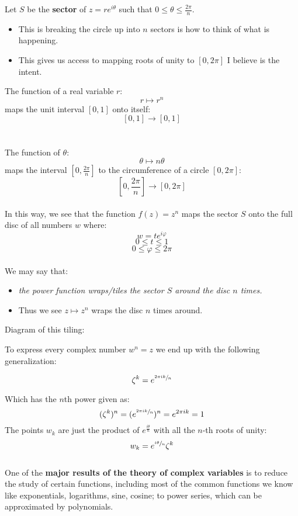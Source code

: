 Let $S$ be the \textbf{sector} of $z = re^{i\theta}$ such that $0 \leq \theta \leq \frac{2\pi}{n}.$ 
\begin{itemize}
	\item This is breaking the circle up into $n$ sectors is how to think of what is happening. 
	\item This gives us access to mapping roots of unity to $[0, 2\pi]$ I believe is the intent.
\end{itemize}

The function of a real variable $r$:
\[r \mapsto r^n \]
maps the unit interval $[0, 1]$ onto itself:
\[[0, 1] \to [0, 1] \]
\\
\\
The function of $\theta$:
\[\theta \mapsto n\theta \]
maps the interval $[0, \frac{2\pi}{n}]$ to the circumference of a circle $[0, 2\pi]$:
\[ [0, \frac{2\pi}{n}] \to [0, 2\pi] \]
\\
In this way, we see that the function $f(z) = z^n$ maps the sector $S$ onto the full disc of all numbers $w$ where:
\[w = te^{i\varphi} \]
\[0 \leq t \leq 1\]
\[0 \leq \varphi \leq 2\pi \]
\\
We may say that:
\begin{itemize}
	\item \textit{the power function wraps/tiles the sector $S$ around the disc $n$ times.}
	\item Thus we see $z \mapsto z^n$ wraps the disc $n$ times around.
\end{itemize}

Diagram of this tiling: \\

To express every complex number $w^n = z$ we end up with the following generalization:
\begin{defn}
	\[\zeta^k = e^{\sfrac{2\pi ik}{n}}\]
\end{defn}
Which has the $n$th power given as:
\[ (\zeta^k)^n = ( e^{\sfrac{2\pi ik}{n}} )^n = e^{2\pi ik} = 1 \]
The points $w_k$ are just the product of $e^{\frac{i\theta}{n}}$ with all the $n$-th roots of unity:
\[w_k = e^{\sfrac{i\theta}{n}}\zeta^k\]
\\
One of the \textbf{major results of the theory of complex variables} is to reduce the study of certain functions, including most of the common functions we know like exponentials, logarithms, sine, cosine; to power series, which can be approximated by polynomials.\\

